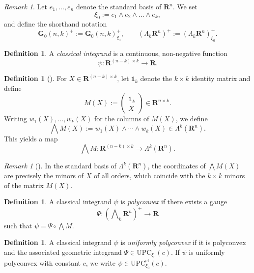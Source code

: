 \documentclass[a4paper,twoside,reqno]{article}
\theoremstyle{definition}
\theoremstyle{remark}
\theoremstyle{plain}
\theoremstyle{remark}
\newtheorem{remark}[theorem]{Remark}
\theoremstyle{definition}
\newtheorem{definition}[theorem]{Definition}
\newcommand{\ograss}[2]{\mathbf{G}_0(#1,#2)}
\newcommand{\UPC}{\mathrm{UPC}}
\newcommand{\R}{\mathbf{R}}
\newcommand{\id}[1]{\mathds{1}_{#1}}
\newcommand{\tbwedge}{{\textstyle \boldsymbol{\bigwedge}}}
\begin{document}
\begin{remark}
    Let $e_1,\ldots,e_n$ denote the standard basis of $\R^n$.  
    We set
    \[
        \xi_0 := e_1 \wedge e_2 \wedge \dots \wedge e_k,
    \]
    and define the shorthand notation
    \[
        \ograss{n}{k}^{+} := \ograss{n}{k}^{+}_{\xi_0}, \qquad
        (\Lambda_k \R^n)^+ := (\Lambda_k \R^n)^+_{\xi_0}.
    \]
\end{remark}

\begin{definition}
    \label{def:classical_integrand}
    A \emph{classical integrand} is a continuous, non-negative function
    \[
        \psi : \R^{(n-k)\times k} \to \R.
    \]
\end{definition}

\begin{definition}[]
    For $X \in \R^{(n-k)\times k}$, let $\id{k}$ denote the $k \times k$
    identity matrix and define
    \[
        M(X) :=
        \begin{pmatrix}
            \id{k} \\
            X
        \end{pmatrix}
        \in \R^{n\times k}.
    \]
    Writing $w_1(X),\ldots,w_k(X)$ for the columns of $M(X)$, we define
    \[
        \tbwedge M(X) := w_1(X)\wedge \cdots \wedge w_k(X)
        \in \Lambda^k(\R^n).
    \]
    This yields a map
    \[
        \tbwedge M :
        \R^{(n-k)\times k}
        \longrightarrow
        \Lambda^k(\R^n).
    \]
\end{definition}

\begin{remark}[]
    In the standard basis of $\Lambda^k(\R^n)$, the coordinates of
    $\bigwedge M(X)$ are precisely the minors of $X$ of all orders, which
    coincide with the $k\times k$ minors of the matrix $M(X)$.
\end{remark}

\begin{definition}
    A classical integrand $\psi$ is \emph{polyconvex} if there exists a gauge
    \begin{displaymath}
        \Psi : (\tbwedge_k \R^n)^+ \longrightarrow \R
    \end{displaymath}
    such that $\psi = \Psi \circ \tbwedge M$.
\end{definition}

\begin{definition}
    A classical integrand $\psi$ is \emph{uniformly polyconvex} if it is
    polyconvex and the associated geometric integrand $\Psi \in \UPC_{\xi_0}(c)$.
    If $\psi$ is uniformly polyconvex with constant $c$, we write
    $\psi \in \UPC^{\text{cl}}_{\xi_0}(c)$.
\end{definition}
\end{document}
